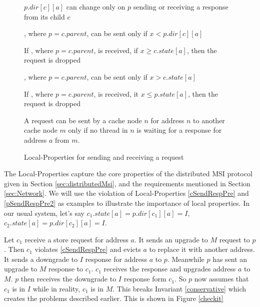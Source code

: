 \begin{figure}
\begin{inv}
$p.dir[c][a]$ can change only on $p$ sending or receiving a response from
its child $c$\label{pState}
\end{inv}
%
\begin{inv}
, where $p = c.parent$, can be sent only if $x < p.dir[c][a]$\label{pSendReqPre}
\end{inv}
\begin{inv}
If , where $p = c.parent$, is received, if $x \ge c.state[a]$,
then the request is dropped\label{pSendReqPost}
\end{inv}
\begin{inv}
, where $p = c.parent$, can be sent only if $x > c.state[a]$\label{cSendReqPre}
\end{inv}
\begin{inv}
If , where $p = c.parent$, is received, it $x \le p.state[a]$,
then the request is dropped\label{cSendReqPost}
\end{inv}
\begin{inv}
A request can be sent by a cache node $n$ for address $n$ to another cache node $m$ only if
no thread in $n$ is waiting for a response for address $a$ from $m$.
\end{inv}
\caption{Local-Properties for sending and receiving a request}
\label{sendReq}
\end{figure}

The Local-Properties capture the core properties of the distributed MSI
protocol given in Section \ref{sec:distributedMsi}, and the requirements
mentioned in Section \ref{sec:Network}.  We will use the violation of
Local-Properties \ref{cSendRespPre} and \ref{pSendRespPre2} as examples to
illustrate the importance of local properties.  In our usual system, let's say
$c_1.state[a] = p.dir[c_1][a] = I$, $c_2.state[a] = p.dir[c_2][a] = I$.

Let $c_1$ receive a store request for address $a$. It sends an upgrade to $M$
request to $p$. Then $c_1$ violates \ref{cSendRespPre} and evicts $a$ to
replace it with another address. It sends a downgrade to $I$ response for
address $a$ to $p$.  Meanwhile $p$ has sent an upgrade to $M$ response to
$c_1$. $c_1$ receives the response and upgrades address $a$ to $M$. $p$ then
receives the downgrade to $I$ response form $c_1$. So $p$ now assumes that
$c_1$ is in $I$ while in reality, $c_1$ is in $M$. This breaks Invariant
\ref{conservative} which creates the problems described earlier. This is shown
in Figure \ref{checkit}

